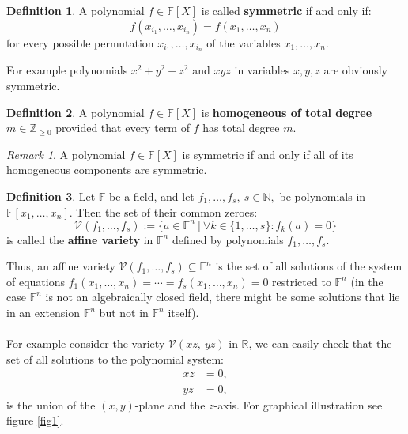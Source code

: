 \documentclass[thesis=M,english]{FITthesis}[2012/10/20]
\theoremstyle{remark}
\newtheorem*{RM}{Remark}
\theoremstyle{definition}
\newtheorem{DF}{Definition}[section]
\begin{document}
\begin{DF}
A polynomial $f \in \mathbb{F}[X]$ is called \textbf{symmetric} if and only if:
$$
f(x_{i_1}, \ldots, x_{i_n}) = f(x_1, \ldots, x_n)
$$
for every possible permutation $x_{i_1}, \ldots, x_{i_n}$ of the variables $x_1, \ldots, x_n$.
\end{DF}
\noindent For example polynomials $x^2+y^2+z^2$ and $xyz$ in variables $x,y,z$ are obviously symmetric.
\begin{DF}
A polynomial $f \in \mathbb{F}[X]$ is \textbf{homogeneous of total degree} $m \in \mathbb{Z}_{\geq 0}$ provided that every term of $f$ has total degree $m$.
\end{DF}
\begin{RM}
A polynomial $f \in \mathbb{F}[X]$ is symmetric if and only if all of its homogeneous components are symmetric.
\end{RM}
\begin{DF}
Let $\mathbb{F}$ be a field, and let $f_1, \ldots, f_s,\ s \in \mathbb{N},$ be polynomials in $\mathbb{F}[x_1,\ldots, x_n].$ Then the set of their common zeroes:
$$
\mathcal{V}(f_1, \ldots, f_s) := \{a \in \mathbb{F}^n\ |\ \forall k \in \{1,\ldots,s\}: f_k(a) =  0\}
$$
is called the \textbf{affine variety} in $\mathbb{F}^n$ defined by polynomials $f_1, \ldots, f_s$.
\end{DF}
\noindent Thus, an affine variety $\mathcal{V}(f_1, \ldots, f_s) \subseteq \mathbb{F}^n$ is the set of all solutions of the system of equations $f_1(x_1,\ldots,x_n) = \cdots = f_s(x_1,\ldots,x_n) = 0$ restricted to $\mathbb{F}^n$ (in the case $\mathbb{F}^n$ is not an algebraically closed field, there might be some solutions that lie in an extension $\mathbb{F}^n$ but not in $\mathbb{F}^n$ itself).\\ \\
\noindent For example consider the variety $\mathcal{V}(xz,\ yz)$ in $\mathbb{R}$, we can easily check that the set of all solutions to the polynomial system:
\begin{align*}
xz &= 0, \\
yz& = 0,
\end{align*}
is the union of the $(x,y)$-plane and the $z$-axis. For graphical illustration see figure \ref{fig1}.
\end{document}
